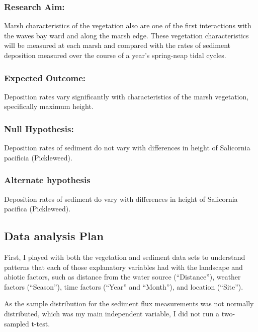\documentclass[
]{article}
\begin{document}
\subsubsection{Research Aim:}\label{research-aim}

Marsh characteristics of the vegetation also are one of the first
interactions with the waves bay ward and along the marsh edge. These
vegetation characteristics will be measured at each marsh and compared
with the rates of sediment deposition measured over the course of a
year's spring-neap tidal cycles.

\subsubsection{Expected Outcome:}\label{expected-outcome}

Deposition rates vary significantly with characteristics of the marsh
vegetation, specifically maximum height.

\subsubsection{Null Hypothesis:}\label{null-hypothesis}

Deposition rates of sediment do not vary with differences in height of
Salicornia pacificia (Pickleweed).

\subsubsection{Alternate hypothesis}\label{alternate-hypothesis}

Deposition rates of sediment do vary with differences in height of
Salicornia pacifica (Pickleweed).

\subsection{Data analysis Plan}\label{data-analysis-plan}

First, I played with both the vegetation and sediment data sets to
understand patterns that each of those explanatory variables had with
the landscape and abiotic factors, such as distance from the water
source (``Distance''), weather factors (``Season''), time factors
(``Year'' and ``Month''), and location (``Site'').

As the sample distribution for the sediment flux measurements was not
normally distributed, which was my main independent variable, I did not
run a two-sampled t-test.
\end{document}

